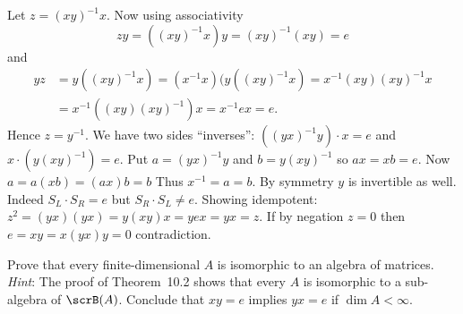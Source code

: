 \begin{enumerate}
\begin{itemize}
    Let \(z = (xy)^{-1} x\). Now using associativity
    \begin{equation*}
      zy = ((xy)^{-1} x)y = (xy)^{-1}(xy) = e
    \end{equation*}
    and 
    \begin{align*}
      yz &= y((xy)^{-1} x) = (x^{-1} x)(y((xy)^{-1} x) = x^{-1}(xy)(xy)^{-1} x \\
         &= x^{-1}((xy)(xy)^{-1})x = x^{-1}ex = e.
    \end{align*}
    Hence \(z = y^{-1}\).
    We have two sides ``inverses'':
    \(((yx)^{-1}y)\cdot x = e\)
    and
    \(x\cdot(y(xy)^{-1}) = e\).
    Put \(a = (yx)^{-1}y\) and \(b = y(xy)^{-1}\)
    so \(ax = xb = e\). Now
    \(a = a(xb) = (ax)b = b\)
    Thus \(x^{-1} = a = b\).
    By symmetry $y$ is invertible as well.
    Indeed \(S_L\cdot S_R = e\) but \(S_R\cdot S_L \neq e\).
    Showing idempotent: \(z^2 = (yx)(yx) = y(xy)x = yex = yx = z\).
    If by negation \(z=0\) then \(e = xy = x(yx)y = 0\) contradiction.
\end{itemize}

\begin{excopy}
Prove that every finite-dimensional $A$ is isomorphic to an algebra of matrices.
\emph{Hint}:
The proof of Theorem~10.2 shows that every $A$ is isomorphic to
a sub-algebra of \(\scrB(A)\).
Conclude that \(xy = e\) implies \(yx = e\) if \(\dim A < \infty\).
\end{excopy}


\end{enumerate}
